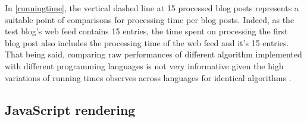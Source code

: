In \autoref{runningtime}, the vertical dashed line at 15 processed blog posts represents a suitable point of comparisons for processing time per blog posts. Indeed, as the test blog's web feed contains 15 entries, the time spent on processing the first blog post also includes the processing time of the web feed and it's 15 entries. That being said, comparing raw performances of different algorithm implemented with different programming languages is not very informative given the high variations of running times observes across languages for identical algorithms \cite{hundt2011}.



\subsection{JavaScript rendering}






